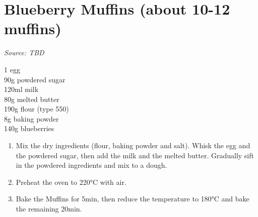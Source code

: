 \documentclass{report}
\begin{document}
\section[Blueberry Muffins]{Blueberry Muffins (about 10-12 muffins)}
\textit{Source: TBD}\\
\begin{minipage}[t]{0.21\textwidth} \vspace{0pt}
1 egg\\
90g powdered sugar\\
120ml milk\\
80g melted butter\\
190g flour (type 550)\\
8g baking powder\\
140g blueberries
\end{minipage}
\hfill
\begin{minipage}[t]{0.78\textwidth} \vspace{0pt}
	\begin{enumerate}
		\item Mix the dry ingredients (flour, baking powder and salt). Whisk the egg and the powdered sugar, then add the milk and the melted butter. Gradually sift in the powdered ingredients and mix to a dough.
		\item Preheat the oven to 220°C with air.
		\item Bake the Muffins for 5min, then reduce the temperature to 180°C and bake the remaining 20min.
	\end{enumerate}	
\end{minipage}
\end{document}
